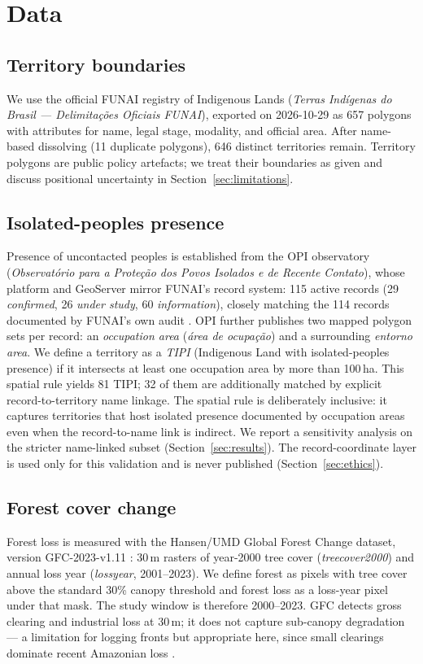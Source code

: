 \section{Data}\label{sec:data}

\subsection{Territory boundaries}
We use the official FUNAI registry of Indigenous Lands (\emph{Terras Ind\'igenas do Brasil --- Delimita\c{c}\~oes Oficiais FUNAI}), exported on 2026-10-29 as 657 polygons with attributes for name, legal stage, modality, and official area. After name-based dissolving (11 duplicate polygons), 646 distinct territories remain. Territory polygons are public policy artefacts; we treat their boundaries as given and discuss positional uncertainty in Section~\ref{sec:limitations}.

\subsection{Isolated-peoples presence}
Presence of uncontacted peoples is established from the OPI observatory (\emph{Observat\'orio para a Prote\c{c}\~ao dos Povos Isolados e de Recente Contato}), whose platform and GeoServer mirror FUNAI's record system: 115 active records (29 \emph{confirmed}, 26 \emph{under study}, 60 \emph{information}), closely matching the 114 records documented by FUNAI's own audit \citep{funai_audit_2024,opi2025}. OPI further publishes two mapped polygon sets per record: an \emph{occupation area} (\emph{\'area de ocupa\c{c}\~ao}) and a surrounding \emph{entorno area}. We define a territory as a \emph{TIPI} (Indigenous Land with isolated-peoples presence) if it intersects at least one occupation area by more than 100\,ha. This spatial rule yields 81 TIPI; 32 of them are additionally matched by explicit record-to-territory name linkage. The spatial rule is deliberately inclusive: it captures territories that host isolated presence documented by occupation areas even when the record-to-name link is indirect. We report a sensitivity analysis on the stricter name-linked subset (Section~\ref{sec:results}). The record-coordinate layer is used only for this validation and is never published (Section~\ref{sec:ethics}).

\subsection{Forest cover change}
Forest loss is measured with the Hansen/UMD Global Forest Change dataset, version GFC-2023-v1.11 \citep{hansen2013,gfc_dataset}: 30\,m rasters of year-2000 tree cover (\emph{treecover2000}) and annual loss year (\emph{lossyear}, 2001--2023). We define forest as pixels with tree cover above the standard 30\% canopy threshold and forest loss as a loss-year pixel under that mask. The study window is therefore 2000--2023. GFC detects gross clearing and industrial loss at 30\,m; it does not capture sub-canopy degradation --- a limitation for logging fronts but appropriate here, since small clearings dominate recent Amazonian loss \citep{kalamandeen2018}.

